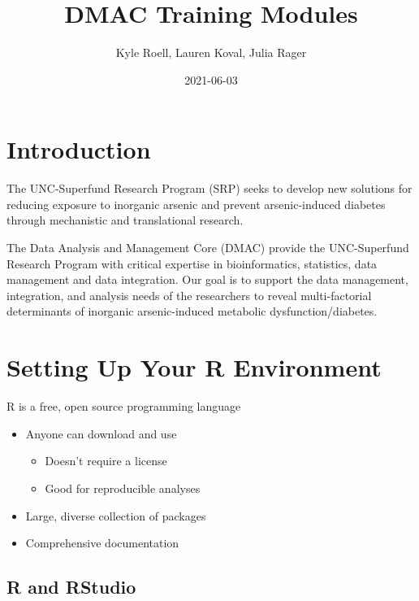 \documentclass[
]{book}
\title{DMAC Training Modules}
\author{Kyle Roell, Lauren Koval, Julia Rager}
\date{2021-06-03}
\providecommand{\tightlist}{%
  \setlength{\itemsep}{0pt}\setlength{\parskip}{0pt}}
\begin{document}
\maketitle

{
\setcounter{tocdepth}{1}
\tableofcontents
}
\hypertarget{introduction}{%
\chapter{Introduction}\label{introduction}}

The UNC-Superfund Research Program (SRP) seeks to develop new solutions for reducing exposure to inorganic arsenic and prevent arsenic-induced diabetes through mechanistic and translational research.

The Data Analysis and Management Core (DMAC) provide the UNC-Superfund Research Program with critical expertise in bioinformatics, statistics, data management and data integration. Our goal is to support the data management, integration, and analysis needs of the researchers to reveal multi-factorial determinants of inorganic arsenic-induced metabolic dysfunction/diabetes.

\hypertarget{intro}{%
\chapter{Setting Up Your R Environment}\label{intro}}

R is a free, open source programming language

\begin{itemize}
\tightlist
\item
  Anyone can download and use

  \begin{itemize}
  \tightlist
  \item
    Doesn't require a license
  \item
    Good for reproducible analyses
  \end{itemize}
\item
  Large, diverse collection of packages
\item
  Comprehensive documentation
\end{itemize}

\hypertarget{r-and-rstudio}{%
\section{R and RStudio}\label{r-and-rstudio}}
\end{document}
